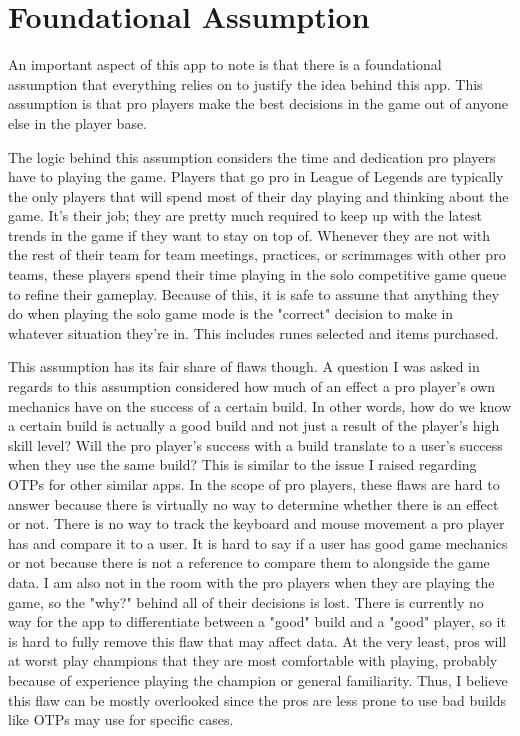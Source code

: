 \documentclass[10pt,twocolumn]{article}
\begin{document}
\section{Foundational Assumption}
An important aspect of this app to note is that there is a foundational assumption that everything relies on to justify the idea behind this app.
This assumption is that pro players make the best decisions in the game out of anyone else in the player base.

The logic behind this assumption considers the time and dedication pro players have to playing the game.
Players that go pro in League of Legends are typically the only players that will spend most of their day playing and thinking about the game.
It's their job; they are pretty much required to keep up with the latest trends in the game if they want to stay on top of.
Whenever they are not with the rest of their team for team meetings, practices, or scrimmages with other pro teams, these players spend their time playing in the solo competitive game queue to refine their gameplay.
Because of this, it is safe to assume that anything they do when playing the solo game mode is the "correct" decision to make in whatever situation they're in.
This includes runes selected and items purchased.

This assumption has its fair share of flaws though.
A question I was asked in regards to this assumption considered how much of an effect a pro player's own mechanics have on the success of a certain build.
In other words, how do we know a certain build is actually a good build and not just a result of the player's high skill level?
Will the pro player's success with a build translate to a user's success when they use the same build?
This is similar to the issue I raised regarding OTPs for other similar apps.
In the scope of pro players, these flaws are hard to answer because there is virtually no way to determine whether there is an effect or not.
There is no way to track the keyboard and mouse movement a pro player has and compare it to a user.
It is hard to say if a user has good game mechanics or not because there is not a reference to compare them to alongside the game data.
I am also not in the room with the pro players when they are playing the game, so the "why?" behind all of their decisions is lost.
There is currently no way for the app to differentiate between a "good" build and a "good" player, so it is hard to fully remove this flaw that may affect data.
At the very least, pros will at worst play champions that they are most comfortable with playing, probably because of experience playing the champion or general familiarity.
Thus, I believe this flaw can be mostly overlooked since the pros are less prone to use bad builds like OTPs may use for specific cases.
\end{document}
